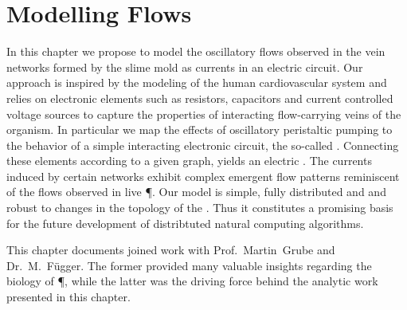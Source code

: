 \chapter{Modelling Flows}\label{chap:model}

	In this chapter we propose to model the oscillatory flows observed in the vein networks formed by the slime mold \Pp as currents in an electric circuit. Our approach is inspired by the modeling of the human cardiovascular system and relies on electronic elements such as resistors, capacitors and current controlled voltage sources to capture the properties of interacting flow-carrying veins of the organism. In particular we map the effects of oscillatory peristaltic pumping to the behavior of a simple interacting electronic circuit, the so-called \Pe. Connecting these elements according to a given graph, yields an electric \Pn. The currents induced by certain networks exhibit complex emergent flow patterns reminiscent of the flows observed in live \P. Our model is simple, fully distributed and and robust to changes in the topology of the \Pn. Thus it constitutes a promising basis for the future development of distribtuted natural computing algorithms.

	This chapter documents joined work with Prof.~Martin~Grube and Dr.~M.~F\"ugger. The former provided many valuable insights regarding the biology of \P, while the latter was the driving force behind the analytic work presented in this chapter.

	

